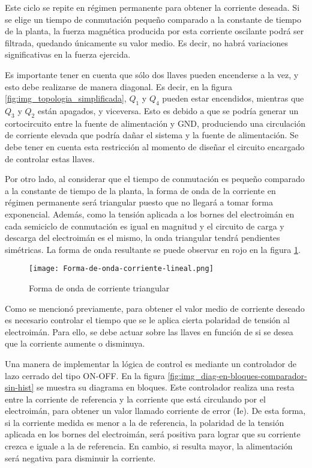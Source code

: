 Este ciclo se repite en régimen permanente para obtener la corriente deseada. Si se elige un tiempo de conmutación pequeño comparado a la constante de tiempo de la planta, la fuerza magnética producida por esta corriente oscilante podrá ser filtrada, quedando únicamente su valor medio. Es decir, no habrá variaciones significativas en la fuerza ejercida.

Es importante tener en cuenta que sólo dos llaves pueden encenderse a la vez, y esto debe realizarse de manera diagonal. Es decir, en la figura \ref{fig:img_topologia_simplificada}, $Q_1$ y $Q_4$ pueden estar encendidos, mientras que $Q_3$ y $Q_2$ están apagados, y viceversa. Esto es debido a que se podría generar un cortocircuito entre la fuente de alimentación y GND, produciendo una circulación de corriente elevada que podría dañar el sistema y la fuente de alimentación. Se debe tener en cuenta esta restricción al momento de diseñar el circuito encargado de controlar estas llaves.

Por otro lado, al considerar que el tiempo de conmutación es pequeño comparado a la constante de tiempo de la planta, la forma de onda de la corriente en régimen permanente será triangular puesto que no llegará a tomar forma exponencial. Además, como la tensión aplicada a los bornes del electroimán en cada semiciclo de conmutación es igual en magnitud y el circuito de carga y descarga del electroimán es el mismo, la onda triangular tendrá pendientes simétricas. La forma de onda resultante se puede observar en rojo en la figura \ref{fig:img_corriente_triangular}.

\begin{figure}[H]
	\centering
	\texttt{[image: Forma-de-onda-corriente-lineal.png]}
	\caption{Forma de onda de corriente triangular}
	\label{fig:img_corriente_triangular}
\end{figure} 

Como se mencionó previamente, para obtener el valor medio de corriente deseado es necesario controlar el tiempo que se le aplica cierta polaridad de tensión al electroimán. Para ello, se debe actuar sobre las llaves en función de si se desea que la corriente aumente o disminuya.

Una manera de implementar la lógica de control es mediante un controlador de lazo cerrado del tipo ON-OFF. En la figura \ref{fig:img_diag-en-bloques-comparador-sin-hist} se muestra su diagrama en bloques. Este controlador realiza una resta entre la corriente de referencia y la corriente que está circulando por el electroimán, para obtener un valor llamado corriente de error (Ie). De esta forma, si la corriente medida es menor a la de referencia, la polaridad de la tensión aplicada en los bornes del electroimán, será positiva para lograr que su corriente crezca e iguale a la de referencia. En cambio, si resulta mayor, la alimentación será negativa para disminuir la corriente.


